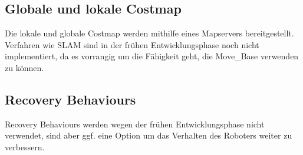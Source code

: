 \documentclass[oribibl]{llncs}
\begin{document}
\subsection{Globale und lokale Costmap}
Die lokale und globale Costmap werden mithilfe eines Mapservers bereitgestellt.
Verfahren wie SLAM sind in der frühen Entwicklungsphase noch nicht implementiert, da es vorrangig um die Fähigkeit geht, die Move\_Base verwenden zu können.
\subsection{Recovery Behaviours}
Recovery Behaviours werden wegen der frühen Entwicklungsphase nicht verwendet, sind aber ggf. eine Option um das Verhalten des Roboters weiter zu verbessern.




\begin{figure}
\end{figure}
\end{document}
